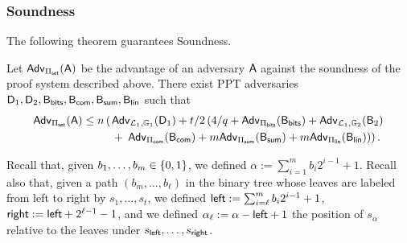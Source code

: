\subsubsection{Soundness}

The following theorem guarantees Soundness. 
 
\begin{theorem} Let \(\mathsf{Adv}_{{\Pi_{\mathsf{set}}}}(\mathsf{A})\) 
be the advantage of an adversary \(\mathsf{A}\) against the soundness of 
the proof system  described above. There exist PPT adversaries
\(\mathsf{D}_1,\mathsf{D}_2,\mathsf{B}_{\mathsf{bits}},\mathsf{B}_{\mathsf{com}},\mathsf{B}_{\mathsf{sum}},\mathsf{B}_\mathsf{lin}\) such that 
\begin{align*}
\mathsf{Adv}_{{\Pi_{\mathsf{set}}}}(\mathsf{A}) \leq 
n \left(\right.
    &\mathsf{Adv}_{\mathcal{L}_1,\mathbb{G}_1}(\mathsf{D}_1) 
        + t /2\left(4/q
            +  \mathsf{Adv}_{\Pi_{\mathsf{bits}}}(\mathsf{B}_{\mathsf{bits}})
            +  \mathsf{Adv}_{\mathcal{L}_1,\mathbb{G}_2}(\mathsf{B}_2)\right. \\
    &+ \left.\left.\mathsf{Adv}_{{\Pi_{\mathsf{com}}}}(\mathsf{B}_{\mathsf{com}})
        + m\mathsf{Adv}_{{\Pi_{\mathsf{sum}}}}(\mathsf{B}_{\mathsf{sum}})
        + m\mathsf{Adv}_{{\Pi_\mathsf{lin}}}(\mathsf{B}_\mathsf{lin})\right)\right).
\end{align*}
\label{teo:bitstr-soundness}
\end{theorem}

Recall that, given $b_1,\ldots,b_m\in\{0,1\}$, we defined $\alpha:=\sum_{i=1}^mb_i2^{i-1}+1$. Recall also that, given a path $(b_m,\ldots, b_\ell)$ in the binary tree whose leaves are labeled from left to right by $s_1,\ldots,s_t$, we defined ${\mathsf{left}}:=\sum_{i=\ell}^m b_i2^{i-1}+1$, ${\mathsf{right}}:={\mathsf{left}}+2^{\ell-1}-1$, and we defined $\alpha_\ell:=\alpha-{\mathsf{left}}+1$ the position of $s_\alpha$ relative to the leaves under $s_{\mathsf{left}},\ldots,s_{\mathsf{right}}$.

